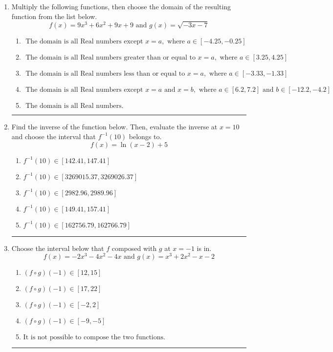 \documentclass[14pt]{extbook}
\newcommand{\litem}[1]{\item#1\hspace*{-1cm}\rule{\textwidth}{0.4pt}}
\begin{document}
\begin{enumerate}
{\begin{enumerate}[label=\Alph*.]
\end{enumerate} }
\litem{
Multiply the following functions, then choose the domain of the resulting function from the list below.\[ f(x) = 9x^{3} +6 x^{2} +9 x + 9 \text{ and } g(x) = \sqrt{-3x-7}  \]\begin{enumerate}[label=\Alph*.]
\item \( \text{ The domain is all Real numbers except } x = a, \text{ where } a \in [-4.25, -0.25] \)
\item \( \text{ The domain is all Real numbers greater than or equal to } x = a, \text{ where } a \in [3.25, 4.25] \)
\item \( \text{ The domain is all Real numbers less than or equal to } x = a, \text{ where } a \in [-3.33, -1.33] \)
\item \( \text{ The domain is all Real numbers except } x = a \text{ and } x = b, \text{ where } a \in [6.2, 7.2] \text{ and } b \in [-12.2, -4.2] \)
\item \( \text{ The domain is all Real numbers. } \)

\end{enumerate} }
\litem{
Find the inverse of the function below. Then, evaluate the inverse at $x = 10$ and choose the interval that $f^{-1}(10)$ belongs to.\[ f(x) = \ln{(x-2)}+5 \]\begin{enumerate}[label=\Alph*.]
\item \( f^{-1}(10) \in [142.41, 147.41] \)
\item \( f^{-1}(10) \in [3269015.37, 3269026.37] \)
\item \( f^{-1}(10) \in [2982.96, 2989.96] \)
\item \( f^{-1}(10) \in [149.41, 157.41] \)
\item \( f^{-1}(10) \in [162756.79, 162766.79] \)

\end{enumerate} }
\litem{
Choose the interval below that $f$ composed with $g$ at $x=-1$ is in.\[ f(x) = -2x^{3} -4 x^{2} -4 x \text{ and } g(x) = x^{3} +2 x^{2} -x -2 \]\begin{enumerate}[label=\Alph*.]
\item \( (f \circ g)(-1) \in [12, 15] \)
\item \( (f \circ g)(-1) \in [17, 22] \)
\item \( (f \circ g)(-1) \in [-2, 2] \)
\item \( (f \circ g)(-1) \in [-9, -5] \)
\item \( \text{It is not possible to compose the two functions.} \)


\end{enumerate}}
\end{enumerate}
\end{document}
